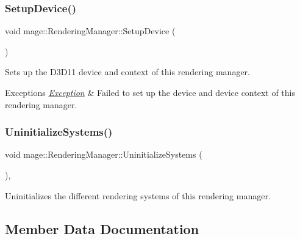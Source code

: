 \subsubsection{\texorpdfstring{Setup\+Device()}{SetupDevice()}}
{\footnotesize\ttfamily void mage\+::\+Rendering\+Manager\+::\+Setup\+Device (\begin{DoxyParamCaption}{ }\end{DoxyParamCaption})\hspace{0.3cm}{\ttfamily [private]}}

Sets up the D3\+D11 device and context of this rendering manager.


\begin{DoxyExceptions}{Exceptions}
{\em \hyperlink{classmage_1_1_exception}{Exception}} & Failed to set up the device and device context of this rendering manager. \\
\hline
\end{DoxyExceptions}
\hypertarget{classmage_1_1_rendering_manager_a3665d58d2a9e8995a348b5f2bd723d8b}{}\label{classmage_1_1_rendering_manager_a3665d58d2a9e8995a348b5f2bd723d8b} 
\subsubsection{\texorpdfstring{Uninitialize\+Systems()}{UninitializeSystems()}}
{\footnotesize\ttfamily void mage\+::\+Rendering\+Manager\+::\+Uninitialize\+Systems (\begin{DoxyParamCaption}{ }\end{DoxyParamCaption})\hspace{0.3cm}{\ttfamily [private]}, {\ttfamily [noexcept]}}

Uninitializes the different rendering systems of this rendering manager. 

\subsection{Member Data Documentation}
\hypertarget{classmage_1_1_rendering_manager_adeb8bcb91a132686d683b33af46979f8}{}\label{classmage_1_1_rendering_manager_adeb8bcb91a132686d683b33af46979f8} 
